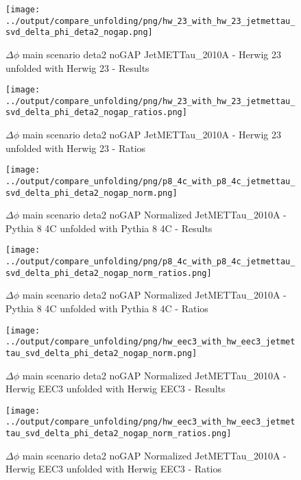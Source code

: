\documentclass[11pt]{book}
\begin{document}
\begin{figure}[ht]
\centering
\texttt{[image: ../output/compare\_unfolding/png/hw\_23\_with\_hw\_23\_jetmettau\_svd\_delta\_phi\_deta2\_nogap.png]}
\caption{$\Delta\phi$ main scenario deta2 noGAP JetMETTau\_2010A - Herwig 23 unfolded with Herwig 23 - Results}
\label{hw_23_hw_23_jetmettau_svd_delta_phi_deta2_nogap_a}
\end{figure}

\begin{figure}[ht]
\centering
\texttt{[image: ../output/compare\_unfolding/png/hw\_23\_with\_hw\_23\_jetmettau\_svd\_delta\_phi\_deta2\_nogap\_ratios.png]}
\caption{$\Delta\phi$ main scenario deta2 noGAP JetMETTau\_2010A - Herwig 23 unfolded with Herwig 23 - Ratios}
\label{hw_23_hw_23_jetmettau_svd_delta_phi_deta2_nogap_b}
\end{figure}

\begin{figure}[ht]
\centering
\texttt{[image: ../output/compare\_unfolding/png/p8\_4c\_with\_p8\_4c\_jetmettau\_svd\_delta\_phi\_deta2\_nogap\_norm.png]}
\caption{$\Delta\phi$ main scenario deta2 noGAP Normalized JetMETTau\_2010A - Pythia 8 4C unfolded with Pythia 8 4C - Results}
\label{p8_p8_jetmettau_svd_delta_phi_deta2_nogap_norm_a}
\end{figure}

\begin{figure}[ht]
\centering
\texttt{[image: ../output/compare\_unfolding/png/p8\_4c\_with\_p8\_4c\_jetmettau\_svd\_delta\_phi\_deta2\_nogap\_norm\_ratios.png]}
\caption{$\Delta\phi$ main scenario deta2 noGAP Normalized JetMETTau\_2010A - Pythia 8 4C unfolded with Pythia 8 4C - Ratios}
\label{p8_p8_jetmettau_svd_delta_phi_deta2_nogap_norm_b}
\end{figure}

\begin{figure}[ht]
\centering
\texttt{[image: ../output/compare\_unfolding/png/hw\_eec3\_with\_hw\_eec3\_jetmettau\_svd\_delta\_phi\_deta2\_nogap\_norm.png]}
\caption{$\Delta\phi$ main scenario deta2 noGAP Normalized JetMETTau\_2010A - Herwig EEC3 unfolded with Herwig EEC3 - Results}
\label{hw_eec3_hw_eec3_jetmettau_svd_delta_phi_deta2_nogap_norm_a}
\end{figure}

\begin{figure}[ht]
\centering
\texttt{[image: ../output/compare\_unfolding/png/hw\_eec3\_with\_hw\_eec3\_jetmettau\_svd\_delta\_phi\_deta2\_nogap\_norm\_ratios.png]}
\caption{$\Delta\phi$ main scenario deta2 noGAP Normalized JetMETTau\_2010A - Herwig EEC3 unfolded with Herwig EEC3 - Ratios}
\label{hw_eec3_hw_eec3_jetmettau_svd_delta_phi_deta2_nogap_norm_b}
\end{figure}
\end{document}
